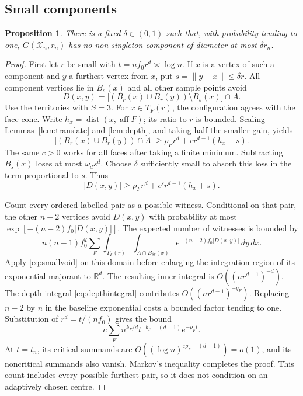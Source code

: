 \documentclass[11pt]{article}
\newtheorem{proposition}[theorem]{Proposition}
\theoremstyle{remark}
\newcommand{\R}{\mathbb R}
\newcommand{\dist}{\operatorname{dist}}
\newcommand{\aff}{\operatorname{aff}}
\begin{document}
\subsection{Small components}
\begin{proposition}\label{prop:small}
There is a fixed $\delta\in(0,1)$ such that, with probability tending to one,
$G(\mathcal X_n,r_n)$ has no non-singleton component of diameter at most
$\delta r_n$.
\end{proposition}
\begin{proof}
First let $r$ be small with $t=nf_0r^d\asymp\log n$.
If $x$ is a vertex of such a component and $y$ a furthest vertex from $x$,
put $s=\|y-x\|\leq\delta r$. All component vertices lie in $B_s(x)$ and all
other sample points avoid
\[
 D(x,y)=\big[(B_r(x)\cup B_r(y))\setminus B_s(x)\big]\cap A.
\]
Use the territories with $S=3$. For $x\in T_F(r)$, the configuration agrees
with the face cone. Write $h_x=\dist(x,\aff F)$; its ratio to $r$ is bounded.
Scaling Lemmas~\ref{lem:translate} and \ref{lem:depth}, and taking half the
smaller gain, yields
\[
 |(B_r(x)\cup B_r(y))\cap A|
 \geq\rho_Fr^d+c r^{d-1}(h_x+s).
\]
The same $c>0$ works for all faces after taking a finite minimum.
Subtracting $B_s(x)$ loses at most $\omega_ds^d$. Choose $\delta$ sufficiently
small to absorb this loss in the term proportional to $s$. Thus
\begin{equation}\label{eq:smallvoid}
 |D(x,y)|\geq\rho_Fr^d+c' r^{d-1}(h_x+s).
\end{equation}

Count every ordered labelled pair as a possible witness. Conditional on
that pair, the other $n-2$ vertices avoid $D(x,y)$ with probability at most
$\exp[-(n-2)f_0|D(x,y)|]$. The expected number of witnesses is bounded by
\[
 n(n-1)f_0^2\sum_F\int_{T_F(r)}
 \int_{A\cap B_{\delta r}(x)}
 e^{-(n-2)f_0|D(x,y)|}\,dy\,dx.
\]
Apply \eqref{eq:smallvoid} on this domain before enlarging the integration
region of its exponential majorant to $\R^d$. The resulting inner integral
is $O((nr^{d-1})^{-d})$.
The depth integral \eqref{eq:depthintegral} contributes
$O((nr^{d-1})^{-q_F})$. Replacing $n-2$ by $n$ in the baseline exponential
costs a bounded factor tending to one. Substitution of $r^d=t/(nf_0)$ gives
the bound
\begin{equation}\label{eq:smallcount}
 c\sum_F n^{k_F/d}t^{-b_F-(d-1)}e^{-\rho_Ft}.
\end{equation}
At $t=t_n$, its critical summands are
$O((\log n)^{\varepsilon\rho_F-(d-1)})=o(1)$, and its noncritical summands
also vanish. Markov's inequality completes the proof. This count includes
every possible furthest pair, so it does not condition on an adaptively
chosen centre.
\end{proof}
\end{document}
